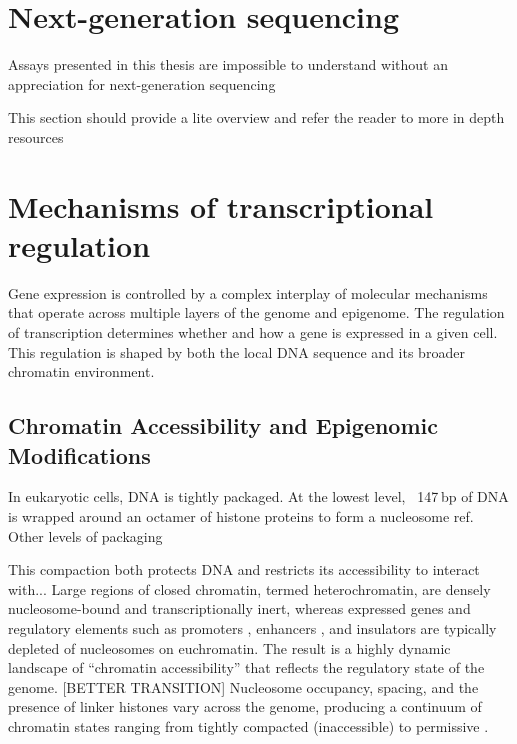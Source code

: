\begin{dissertationintroduction}
    \section{Next-generation sequencing}

    Assays presented in this thesis are impossible to understand without an appreciation for next-generation sequencing

    This section should provide a lite overview and refer the reader to more in depth resources
    
    \section{Mechanisms of transcriptional regulation}

    Gene expression is controlled by a complex interplay of molecular mechanisms that operate across multiple layers of the genome and epigenome. The regulation of transcription determines whether and how a gene is expressed in a given cell. This regulation is shaped by both the local DNA sequence and its broader chromatin environment.

    \subsection{Chromatin Accessibility and Epigenomic Modifications}

    In eukaryotic cells, DNA is tightly packaged. At the lowest level, ~147 bp of DNA is wrapped around an octamer of histone proteins to form a nucleosome {ref}. Other levels of packaging

    This compaction both protects DNA and restricts its accessibility to interact with... Large regions of closed chromatin, termed heterochromatin, are densely nucleosome-bound and transcriptionally inert, whereas expressed genes and regulatory elements such as promoters {}, enhancers {}, and insulators {} are typically depleted of nucleosomes on euchromatin. The result is a highly dynamic landscape of “chromatin accessibility” that reflects the regulatory state of the genome. [BETTER TRANSITION] Nucleosome occupancy, spacing, and the presence of linker histones vary across the genome, producing a continuum of chromatin states ranging from tightly compacted (inaccessible) to permissive {}. 


\end{dissertationintroduction}
